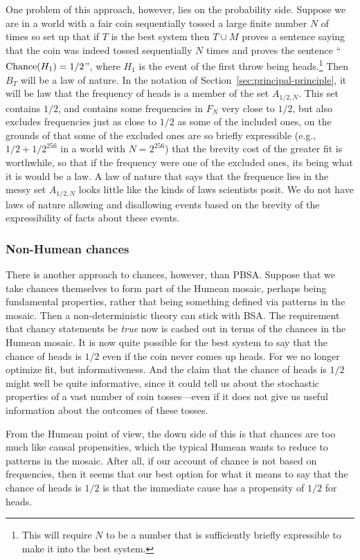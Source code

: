 One problem of this approach, however, lies on the probability side. Suppose we are in a world with a fair coin sequentially tossed a large finite 
number $N$ of times so set up that if $T$ is the best system then $T\cup M$ proves a sentence saying that the coin was indeed tossed 
sequentially $N$ times and proves the sentence ``$\operatorname{Chance}(H_1)=1/2$'', where $H_1$ is the event of the first throw being heads.\footnote{This 
will require $N$ to be a number that is sufficiently briefly expressible to make it into the best system.} Then $B_T$ will be a law of nature.
In the notation of Section~\ref{sec:principal-principle}, it will be law that the frequency of heads is a member of the set $A_{1/2,N}$.
This set contains $1/2$, and contains some frequencies in $F_N$ very close to $1/2$, but also excludes frequencies just as close to
$1/2$ as some of the included ones, on the grounds of that some of the excluded ones are so briefly expressible (e.g., $1/2+1/2^{256}$
in a world with $N=2^{256}$) that the brevity cost of the greater fit is worthwhile, so that if the frequency
were one of the excluded ones, its being what it is would be a law. A law of nature that says that the frequence
lies in the messy set $A_{1/2,N}$ looks little like the 
kinds of laws scientists posit. We do not have laws of nature allowing and disallowing events based on the brevity of the expressibility 
of facts about these events.

\subsubsection{Non-Humean chances}
There is another approach to chances, however, than PBSA. Suppose that we take chances themselves to form part of the Humean
mosaic, perhaps being fundamental properties, rather that being something defined via patterns in the mosaic. Then a 
non-deterministic theory can stick with BSA. The requirement that chancy statements be \textit{true} now is cashed
out in terms of the chances in the Humean mosaic. It is now quite possible for the best system to say that the chance
of heads is $1/2$ even if the coin never comes up heads. For we no longer optimize fit, but informativeness. And the
claim that the chance of heads is $1/2$ might well be quite informative, since it could tell us about the stochastic 
properties of a vast number of coin tosses---even if it does not give us useful information about the outcomes of
these tosses.

From the Humean point of view, the down side of this is that chances are too much like causal propensities, which the
typical Humean wants to reduce to patterns in the mosaic. After all, if our account of chance is not based on frequencies,
then it seems that our best option for what it means to say that the chance of heads is $1/2$ is that the immediate
cause has a propensity of $1/2$ for heads.

